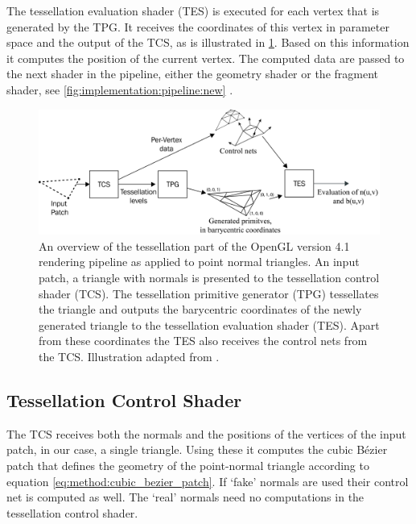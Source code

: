 	The tessellation evaluation shader (TES) is executed for each vertex that is generated by the TPG. 
	It receives the coordinates of this vertex in parameter space and the output of the TCS, as is illustrated in \cref{fig:implementation:tessellationPipeline}. 
	Based on this information it computes the position of the current vertex. 
	The computed data are passed to the next shader in the pipeline, either the geometry shader or the fragment shader, see \cref{fig:implementation:pipeline:new} \cite{wolff2013opengl}.

	\begin{figure}
		\centering
		\includegraphics[width=\textwidth, height = 0.25\textheight, keepaspectratio]{content/img/implementation/tessellationPipeline-01.png}
		\caption{An overview of the tessellation part of the OpenGL version 4.1 rendering pipeline as applied to point normal triangles. An input patch, a triangle with normals is presented to the tessellation control shader (TCS). The tessellation primitive generator (TPG) tessellates the triangle and outputs the barycentric coordinates of the newly generated triangle to the tessellation evaluation shader (TES). Apart from these coordinates the TES also receives the control nets from the TCS. Illustration adapted from \cite{wolff2013opengl}.}
		\label{fig:implementation:tessellationPipeline}
	\end{figure}

\subsection{Tessellation Control Shader}
\label{ss:implementation:tcs}
	The TCS receives both the normals and the positions of the vertices of the input patch, in our case, a single triangle. 
		Using these it computes the cubic Bézier patch that defines the geometry of the point-normal triangle according to equation \eqref{eq:method:cubic_bezier_patch}.
		If `fake' normals are used their control net is computed as well. 
		The `real' normals need no computations in the tessellation control shader.

